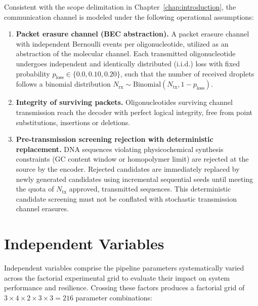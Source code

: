 Consistent with the scope delimitation in Chapter~\ref{chap:introduction}, the communication channel is modeled under the following operational assumptions:
\begin{enumerate}
    \item \textbf{Packet erasure channel (BEC abstraction).} A packet erasure channel with independent Bernoulli events per oligonucleotide, utilized as an abstraction of the molecular channel. Each transmitted oligonucleotide undergoes independent and identically distributed (i.i.d.) loss with fixed probability $p_{\text{loss}} \in \{0.0, 0.10, 0.20\}$, such that the number of received droplets follows a binomial distribution $N_{\text{rx}} \sim \text{Binomial}(N_{\text{tx}}, 1 - p_{\text{loss}})$.
    \item \textbf{Integrity of surviving packets.} Oligonucleotides surviving channel transmission reach the decoder with perfect logical integrity, free from point substitutions, insertions or deletions.
    \item \textbf{Pre-transmission screening rejection with deterministic replacement.} DNA sequences violating physicochemical synthesis constraints (GC content window or homopolymer limit) are rejected at the source by the encoder. Rejected candidates are immediately replaced by newly generated candidates using incremental sequential seeds until meeting the quota of $N_{\text{tx}}$ approved, transmitted sequences. This deterministic candidate screening must not be conflated with stochastic transmission channel erasures.
\end{enumerate}

\section{Independent Variables}
\label{sec:independent_variables}

Independent variables comprise the pipeline parameters systematically varied across the factorial experimental grid to evaluate their impact on system performance and resilience. Crossing these factors produces a factorial grid of $3 \times 4 \times 2 \times 3 \times 3 = 216$ parameter combinations:

